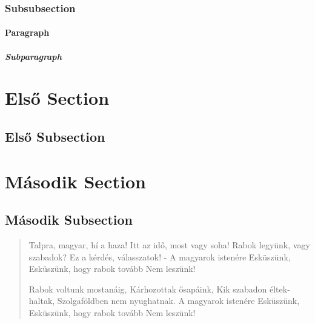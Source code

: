 \documentclass[12pt,twoside]{article}
\begin{document}
\subsubsection{Subsubsection}
\paragraph{Paragraph}
\subparagraph{Subparagraph}

\appendix
\section{Első Section}
\subsection{Első Subsection}
\quote{\hulipsum[2]}
\section{Második Section}
\subsection{Második Subsection}
\quotation{\blindtext[2]}
\clearpage
\begin{verse}
Talpra, magyar, hí a haza!
Itt az idő, most vagy soha!
Rabok legyünk, vagy szabadok?
Ez a kérdés, válasszatok! -
A magyarok istenére
Esküszünk,
Esküszünk, hogy rabok tovább
Nem leszünk!

Rabok voltunk mostanáig,
Kárhozottak ősapáink,
Kik szabadon éltek-haltak,
Szolgaföldben nem nyughatnak.
A magyarok istenére
Esküszünk,
Esküszünk, hogy rabok tovább
Nem leszünk!


\end{verse}
\end{document}
